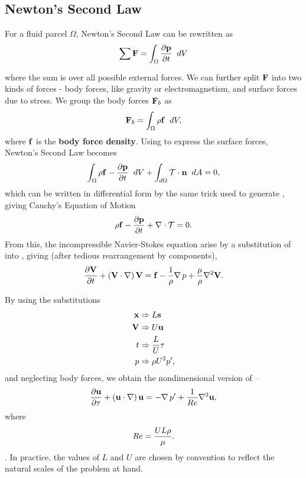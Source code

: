 \subsection{Newton's Second Law}
For a fluid parcel $\Omega$, Newton's Second Law can be rewritten as
\begin{equation}
\sum{}{}{\Vector{F}} = \int{\Omega}{}{
							\pder{1}{\Vector{p}}{t}}{dV}
\end{equation}
where the sum is over all possible external forces. We can further split $\mathbf{F}$ into two kinds of forces - body forces, like gravity or electromagnetism, and surface forces due to stress. We group the body forces $\mathbf{F}_b$ as \begin{equation}
\Vector{F}_b = \int{\Omega}{}{\rho\Vector{f}}{dV},
\end{equation}
where $\mathbf{f}$ is the {\bf body force density}. Using  to express the surface forces, Newton's Second Law becomes
\begin{equation}
\int{\Omega}{}{\rho{\Vector{f}-\pder{1}{\Vector{p}}{t}}}{dV} + \int{d\Omega}{}{\Tensor{T}\cdot\Vector{n}}{dA} = 0,
\end{equation}
which can be written in differential form by the same trick used to generate , giving Cauchy's Equation of Motion
\begin{equation}\label{eq:CauchyEOM}
\rho{\Vector{f}-\pder{1}{\Vector{p}}{t} } + \Div{\Tensor{T}} = 0.
\end{equation}
From this, the incompressible Navier-Stokes equation arise by a substitution of  into , giving (after tedious rearrangement by components),
\begin{equation}\label{eq:NS}
\pder{1}{\Vector{V}}{t} + \paren{\Vector{V}\cdot\nabla}\Vector{V} = \Vector{f} - \frac{1}{\rho}\Grad{p} + \frac{\mu}{\rho}\nabla^2\Vector{V}.
\end{equation}

By using the substitutions
\begin{align}
\mathbf{x} &\Rightarrow L\mathbf{s}\\
\mathbf{V} &\Rightarrow U\mathbf{u}\\
t &\Rightarrow \dfrac{L}{U}\tau\\
p &\Rightarrow \rho U^2p',
\end{align}
and neglecting body forces, we obtain the nondimensional version of  --
\begin{equation}\label{eq:NSND}
\pder{1}{\Vector{u}}{\tau} + \paren{\Vector{u}\cdot\nabla}\Vector{u} = -\Grad{p'} + \frac{1}{\ReN}\nabla^2\Vector{u},
\end{equation}
where \begin{equation}\label{eq:ReN}Re= \dfrac{UL\rho}{\mu}.\end{equation}. In practice, the values of $L$ and $U$ are chosen by convention to reflect the natural scales of the problem at hand.
 
